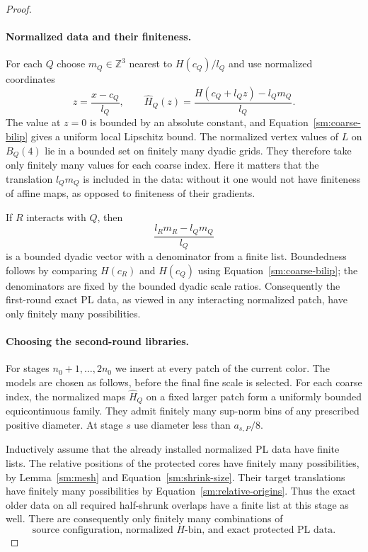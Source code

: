 \documentclass[11pt]{article}
\numberwithin{equation}{section}
\theoremstyle{definition}
\theoremstyle{remark}
\begin{document}
\begin{proof}
\paragraph{Normalized data and their finiteness.}
For each $Q$ choose $m_Q\in\mathbb Z^3$ nearest to
$H(c_Q)/l_Q$ and use normalized coordinates
\begin{equation}
 \label{sm:normalization}
 z=\frac{x-c_Q}{l_Q},\qquad
 \widehat H_Q(z)=\frac{H(c_Q+l_Qz)-l_Qm_Q}{l_Q}.
\end{equation}
The value at $z=0$ is bounded by an absolute constant,
and Equation~\eqref{sm:coarse-bilip} gives a uniform local
Lipschitz bound.  The normalized vertex values of $L$
on $B_Q(4)$ lie in a bounded set on finitely many
dyadic grids.  They therefore take only finitely many
values for each coarse index.  Here it matters that
the translation $l_Qm_Q$ is included in the data:
without it one would not have finiteness of affine
maps, as opposed to finiteness of their gradients.

If $R$ interacts with $Q$, then
\begin{equation}
 \label{sm:relative-origins}
 \frac{l_Rm_R-l_Qm_Q}{l_Q}
\end{equation}
is a bounded dyadic vector with a denominator from a
finite list.  Boundedness follows by comparing
$H(c_R)$ and $H(c_Q)$ using Equation~\eqref{sm:coarse-bilip};
the denominators are fixed by the bounded dyadic
scale ratios.  Consequently the first-round exact
PL data, as viewed in any interacting normalized
patch, have only finitely many possibilities.

\paragraph{Choosing the second-round libraries.}
For stages $n_0+1,\ldots,2n_0$ we insert at every
patch of the current color.  The models are chosen
as follows, before the final fine scale is selected.
For each coarse index, the normalized maps
$\widehat H_Q$ on a fixed larger patch form a
uniformly bounded equicontinuous family.  They
admit finitely many sup-norm bins of any prescribed
positive diameter.  At stage $s$ use diameter less
than $a_{s,P}/8$.

Inductively assume that the already installed
normalized PL data have finite lists.  The
relative positions of the protected cores have
finitely many possibilities, by
Lemma~\ref{sm:mesh} and Equation~\eqref{sm:shrink-size}.
Their target translations have finitely many
possibilities by Equation~\eqref{sm:relative-origins}.
Thus the exact older data on all required
half-shrunk overlaps have a finite list at this
stage as well.  There are consequently only
finitely many combinations of
\begin{equation}
 \label{sm:model-combination}
 \text{source configuration, normalized }H\text{-bin,
 and exact protected PL data}.
\end{equation}


\end{proof}
\end{document}
